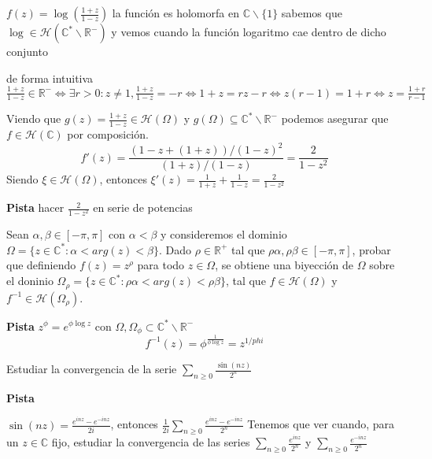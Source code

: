 \begin{sol}

$f(z) = \log(\frac{1+z}{1-z})$
la función es holomorfa en $\mathbb{C}\backslash \{1\}$
sabemos que $\log \in \mathcal{H}(\mathbb{C}^{\ast}\backslash\mathbb{R}^-)$
y vemos cuando la función logaritmo cae dentro de dicho conjunto

de forma intuitiva
$\frac{1+z}{1-z} \in\mathbb{R}^- \Longleftrightarrow \exists r>0 : z\not=1, \frac{1+z}{1-z} = -r \Longleftrightarrow 1+z = rz-r \Longleftrightarrow z(r-1)=1+r \Longleftrightarrow z = \frac{1+r}{r-1}$

Viendo que
$g(z) = \frac{1+z}{1-z} \in\mathcal{H}(\Omega)$ y $g(\Omega) \subseteq \mathbb{C}^{\ast}\backslash \mathbb{R}^-$
podemos asegurar que $f\in\mathcal{H}(\mathbb{C})$ por composición.
$$f'(z) = \frac{ (1-z+(1+z))/(1-z)^2 }{ (1+z)/(1-z) } = \frac{2}{1-z^2}$$
Siendo $\xi\in\mathcal{H}(\Omega)$, entonces
$\xi '(z) = \frac{1}{1+z} + \frac{1}{1-z} = \frac{2}{1-z^2}$



\textbf{Pista}
hacer $\frac{2}{1-z^2}$ en serie de potencias
\end{sol}





\begin{ejer}
	Sean $\alpha,\beta\in [-\pi,\pi]$ con $\alpha < \beta$ y consideremos el dominio $\Omega = \{ z\in\mathbb{C}^{\ast} : \alpha < arg(z) < \beta \}$. Dado $\rho\in\mathbb{R}^+$ tal que $\rho\alpha,\rho\beta\in[-\pi,\pi]$, probar que definiendo $f(z) = z^{\rho}$ para todo $z\in\Omega$, se obtiene una biyección de $\Omega$ sobre el doninio $\Omega_{\rho} = \{ z\in\mathbb{C}^{\ast} : \rho\alpha < arg(z) < \rho\beta \}$, tal que $f\in\mathcal{H}(\Omega)$ y $f^{-1}\in\mathcal{H}(\Omega_{\rho})$.
\end{ejer}
\textbf{Pista}
$z^{\phi} = e^{ \phi \log z}$ con $\Omega,\Omega_{\phi} \subset \mathbb{C}^{\ast}\backslash \mathbb{R^-}$
$$f^{-1}(z) = \phi^{\frac{1}{\phi\log z}} = z^{1/{phi}}$$


\begin{ejer}
	Estudiar la convergencia de la serie $\sum_{n\geq 0} \frac{\sin(nz)}{2^n}$
\end{ejer}
\textbf{Pista}

$\sin(nz) = \frac{e^{inz}-e^{-inz}}{2i}$, entonces
$\frac{1}{2i} \sum_{n\geq 0} \frac{e^{inz}-e^{-inz}}{2^n}$
Tenemos que ver cuando, para un $z\in\mathbb{C}$ fijo, estudiar la convergencia de las series
$\sum_{n\geq 0} \frac{e^{inz}}{2^n}$ y $\sum_{n\geq 0} \frac{e^{-inz}}{2^n}$

